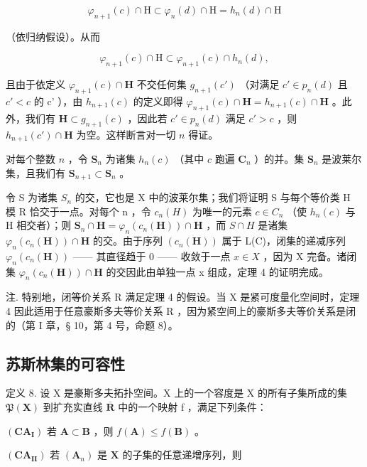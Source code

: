 \[
\varphi_ {n + 1} (c) \cap \mathrm{H} \subset \varphi_ {n} (d) \cap \mathrm{H} = h _ {n} (d) \cap \mathrm{H}
\]

（依归纳假设）。从而

\[
\varphi_ {n + 1} (c) \cap \mathrm{H} \subset \varphi_ {n + 1} (c) \cap h _ {n} (d),
\]

且由于依定义 \(\varphi_{n+1}(c) \cap \mathbf{H}\) 不交任何集 \(g_{n+1}(c')\) （对满足 \(c' \in p_n(d)\) 且 \(c' < c\) 的 c' ），由 \(h_{n+1}(c)\) 的定义即得 \(\varphi_{n+1}(c) \cap \mathbf{H} = h_{n+1}(c) \cap \mathbf{H}\) 。此外，我们有 \(\mathbf{H} \subset g_{n+1}(c)\) ，因此若 \(c' \in p_n(d)\) 满足 \(c' > c\) ，则 \(h_{n+1}(c') \cap \mathbf{H}\) 为空。这样断言对一切 \(n\) 得证。

对每个整数 \(n\) ，令 \(\mathbf{S}_n\) 为诸集 \(h_n(c)\) （其中 \(c\) 跑遍 \(\mathbf{C}_n\) ）的并。集 \(\mathbf{S}_n\) 是波莱尔集，且我们有 \(\mathbf{S}_{n+1} \subset \mathbf{S}_n\) 。

令 S 为诸集 \(S_{n}\) 的交，它也是 X 中的波莱尔集；我们将证明 S 与每个等价类 H 模 R 恰交于一点。对每个 n ，令 \(c_{n}(H)\) 为唯一的元素 \(c \in C_{n}\) （使 \(h_{n}(c)\) 与 H 相交者）；则 \(\mathbf{S}_{n} \cap \mathbf{H} = \varphi_{n}(c_{n}(\mathbf{H})) \cap \mathbf{H}\) ，而 \(S \cap H\) 是诸集 \(\varphi_{n}(c_{n}(\mathbf{H})) \cap \mathbf{H}\) 的交。由于序列 \((c_{n}(\mathbf{H}))\) 属于 L(C)，闭集的递减序列 \(\varphi_{n}(c_{n}(\mathbf{H}))\) —— 其直径趋于 0 —— 收敛于一点 \(x \in X\) ，因为 X 完备。诸闭集 \(\varphi_{n}(c_{n}(\mathbf{H})) \cap \mathbf{H}\) 的交因此由单独一点 x 组成，定理 4 的证明完成。

注. 特别地，闭等价关系 R 满足定理 4 的假设。当 X 是紧可度量化空间时，定理 4 因此适用于任意豪斯多夫等价关系 R ，因为紧空间上的豪斯多夫等价关系是闭的（第 I 章，§ 10，第 4 号，命题 8）。

\subsection{苏斯林集的可容性}

定义 8. 设 X 是豪斯多夫拓扑空间。X 上的一个容度是 X 的所有子集所成的集 \(\mathfrak{P}(\mathbf{X})\) 到扩充实直线 \(\overline{\mathbf{R}}\) 中的一个映射 f ，满足下列条件：

\((\mathbf{CA}_{\mathbf{I}})\) 若 \(\mathbf{A} \subset \mathbf{B}\) ，则 \(f(\mathbf{A}) \leqslant f(\mathbf{B})\) 。

\((\mathbf{CA}_{\mathbf{II}})\) 若 \((\mathbf{A}_n)\) 是 \(\mathbf{X}\) 的子集的任意递增序列，则

